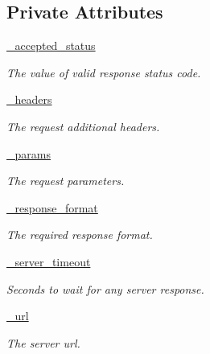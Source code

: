 \subsection*{Private Attributes}
\begin{DoxyCompactItemize}
\item 
\hyperlink{classsrc_1_1rapp__http__request__handler_1_1RappHttpRequestHandler_a53bc07bf231c410b5d5ad043f36cd800}{\-\_\-accepted\-\_\-status}
\begin{DoxyCompactList}\small\item\em The value of valid response status code. \end{DoxyCompactList}\item 
\hyperlink{classsrc_1_1rapp__http__request__handler_1_1RappHttpRequestHandler_acf070e840eae743e63e53903efecbb10}{\-\_\-headers}
\begin{DoxyCompactList}\small\item\em The request additional headers. \end{DoxyCompactList}\item 
\hyperlink{classsrc_1_1rapp__http__request__handler_1_1RappHttpRequestHandler_a4ec9b7ae43ef1dc659e2564ae5404a14}{\-\_\-params}
\begin{DoxyCompactList}\small\item\em The request parameters. \end{DoxyCompactList}\item 
\hyperlink{classsrc_1_1rapp__http__request__handler_1_1RappHttpRequestHandler_a9cbde05328347d9f42a4f7aa3e1698d6}{\-\_\-response\-\_\-format}
\begin{DoxyCompactList}\small\item\em The required response format. \end{DoxyCompactList}\item 
\hyperlink{classsrc_1_1rapp__http__request__handler_1_1RappHttpRequestHandler_af4fec78b4cff29204738ac5169622a88}{\-\_\-server\-\_\-timeout}
\begin{DoxyCompactList}\small\item\em Seconds to wait for any server response. \end{DoxyCompactList}\item 
\hyperlink{classsrc_1_1rapp__http__request__handler_1_1RappHttpRequestHandler_abafcaefc660c7ac4b01a14b2d44c358b}{\-\_\-url}
\begin{DoxyCompactList}\small\item\em The server url. \end{DoxyCompactList}\end{DoxyCompactItemize}


